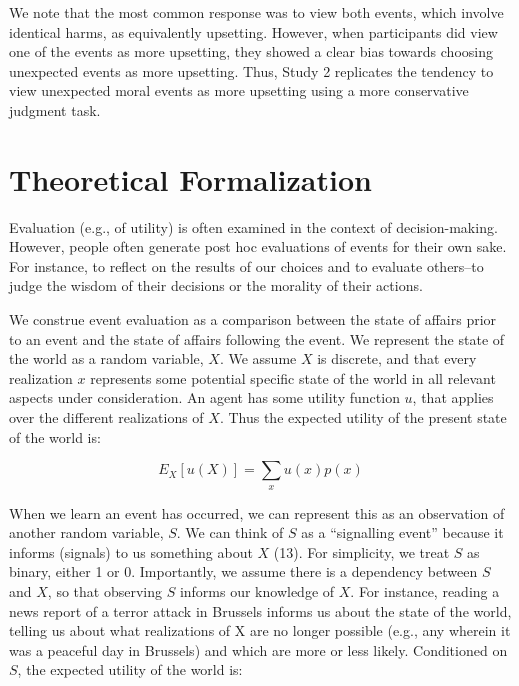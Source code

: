 \documentclass[9pt,twocolumn,twoside,lineno]{pnas-new}
\begin{document}
We note that the most common response was to view both events, which
involve identical harms, as equivalently upsetting. However, when
participants did view one of the events as more upsetting, they showed a
clear bias towards choosing unexpected events as more upsetting. Thus,
Study 2 replicates the tendency to view unexpected moral events as more
upsetting using a more conservative judgment task.

\section*{Theoretical Formalization}\label{theory}

Evaluation (e.g., of utility) is often examined in the context of
decision-making. However, people often generate post hoc evaluations of
events for their own sake. For instance, to reflect on the results of
our choices and to evaluate others--to judge the wisdom of their
decisions or the morality of their actions.

We construe event evaluation as a comparison between the state of
affairs prior to an event and the state of affairs following the event.
We represent the state of the world as a random variable, \(X\). We
assume \(X\) is discrete, and that every realization \(x\) represents
some potential specific state of the world in all relevant aspects under
consideration. An agent has some utility function \(u\), that applies
over the different realizations of \(X\). Thus the expected utility of
the present state of the world is:

\begin{equation}
E_X[u(X)] = \sum_x u(x)p(x)
\end{equation}

When we learn an event has occurred, we can represent this as an
observation of another random variable, \(S\). We can think of \(S\) as
a ``signalling event'' because it informs (signals) to us something
about \(X\) (13). For simplicity, we treat \(S\) as binary, either 1 or
0. Importantly, we assume there is a dependency between \(S\) and \(X\),
so that observing \(S\) informs our knowledge of \(X\). For instance,
reading a news report of a terror attack in Brussels informs us about
the state of the world, telling us about what realizations of X are no
longer possible (e.g., any wherein it was a peaceful day in Brussels)
and which are more or less likely. Conditioned on \(S\), the expected
utility of the world is:
\end{document}
